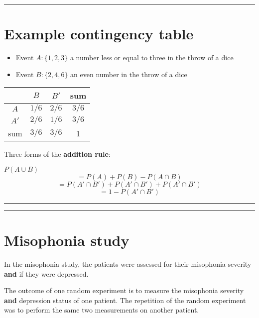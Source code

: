 \documentclass[
]{book}
\providecommand{\tightlist}{%
  \setlength{\itemsep}{0pt}\setlength{\parskip}{0pt}}
\begin{document}
\begin{center}\rule{0.5\linewidth}{0.5pt}\end{center}

\hypertarget{example-contingency-table}{%
\section{Example contingency table}\label{example-contingency-table}}

\begin{itemize}
\tightlist
\item
  Event \(A:\{1,2,3\}\) a number less or equal to three in the throw of a dice\\
\item
  Event \(B:\{2,4,6\}\) an even number in the throw of a dice
\end{itemize}

\begin{longtable}[]{@{}cccc@{}}
\toprule
& \(B\) & \(B'\) & sum \\
\midrule
\endhead
\(A\) & \(1/6\) & \(2/6\) & \(3/6\) \\
\(A'\) & \(2/6\) & \(1/6\) & \(3/6\) \\
sum & \(3/6\) & \(3/6\) & 1 \\
\bottomrule
\end{longtable}

Three forms of the \textbf{addition rule}:

\(P(A \cup B)\)\[=P(A) + P(B) - P(A\cap B)\]
\[=P(A'\cap B')+P(A'\cap B')+P(A'\cap B')\]
\[=1-P(A'\cap B')\]

\begin{center}\rule{0.5\linewidth}{0.5pt}\end{center}

\begin{center}\rule{0.5\linewidth}{0.5pt}\end{center}

\hypertarget{misophonia-study}{%
\section{Misophonia study}\label{misophonia-study}}

In the misophonia study, the patients were assessed for their misophonia severity \textbf{and} if they were depressed.

The outcome of one random experiment is to measure the misophonia severity \textbf{and} depression status of one patient. The repetition of the random experiment was to perform the same two measurements on another patient.
\end{document}
